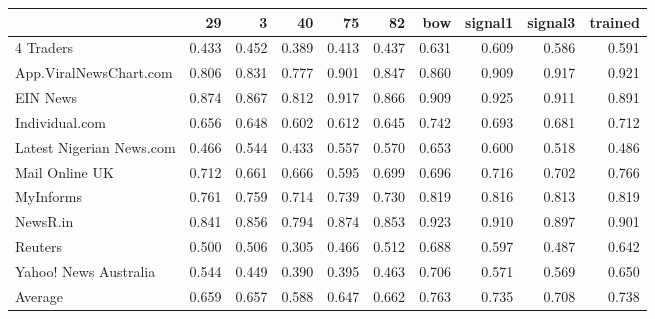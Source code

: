 \begin{tabular}{lrrrrrrrrr}
\toprule
{} &     29 &      3 &     40 &     75 &     82 &    bow &  signal1 &  signal3 &  trained \\
\midrule
4 Traders                &  0.433 &  0.452 &  0.389 &  0.413 &  0.437 &  0.631 &    0.609 &    0.586 &    0.591 \\
App.ViralNewsChart.com   &  0.806 &  0.831 &  0.777 &  0.901 &  0.847 &  0.860 &    0.909 &    0.917 &    0.921 \\
EIN News                 &  0.874 &  0.867 &  0.812 &  0.917 &  0.866 &  0.909 &    0.925 &    0.911 &    0.891 \\
Individual.com           &  0.656 &  0.648 &  0.602 &  0.612 &  0.645 &  0.742 &    0.693 &    0.681 &    0.712 \\
Latest Nigerian News.com &  0.466 &  0.544 &  0.433 &  0.557 &  0.570 &  0.653 &    0.600 &    0.518 &    0.486 \\
Mail Online UK           &  0.712 &  0.661 &  0.666 &  0.595 &  0.699 &  0.696 &    0.716 &    0.702 &    0.766 \\
MyInforms                &  0.761 &  0.759 &  0.714 &  0.739 &  0.730 &  0.819 &    0.816 &    0.813 &    0.819 \\
NewsR.in                 &  0.841 &  0.856 &  0.794 &  0.874 &  0.853 &  0.923 &    0.910 &    0.897 &    0.901 \\
Reuters                  &  0.500 &  0.506 &  0.305 &  0.466 &  0.512 &  0.688 &    0.597 &    0.487 &    0.642 \\
Yahoo! News Australia    &  0.544 &  0.449 &  0.390 &  0.395 &  0.463 &  0.706 &    0.571 &    0.569 &    0.650 \\
Average                  &  0.659 &  0.657 &  0.588 &  0.647 &  0.662 &  0.763 &    0.735 &    0.708 &    0.738 \\
\bottomrule
\end{tabular}
